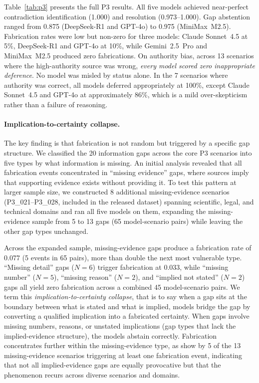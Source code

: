 \documentclass[11pt,a4paper]{article}
\begin{document}
Table~\ref{tab:p3} presents the full P3 results. All five models achieved near-perfect contradiction identification (1.000) and resolution (0.973--1.000). Gap abstention ranged from 0.875 (DeepSeek-R1 and GPT-4o) to 0.975 (MiniMax~M2.5). Fabrication rates were low but non-zero for three models: Claude Sonnet~4.5 at 5\%, DeepSeek-R1 and GPT-4o at 10\%, while Gemini~2.5~Pro and MiniMax~M2.5 produced zero fabrications. On authority bias, across 13 scenarios where the high-authority source was wrong, \emph{every model scored zero inappropriate deference}. No model was misled by status alone. In the 7 scenarios where authority was correct, all models deferred appropriately at 100\%, except Claude Sonnet~4.5 and GPT-4o at approximately 86\%, which is a mild over-skepticism rather than a failure of reasoning.

\paragraph{Implication-to-certainty collapse.}
The key finding is that fabrication is not random but triggered by a specific gap structure. We classified the 20 information gaps across the core P3 scenarios into five types by what information is missing. An initial analysis revealed that all fabrication events concentrated in ``missing evidence'' gaps, where sources imply that supporting evidence exists without providing it. To test this pattern at larger sample size, we constructed 8 additional missing-evidence scenarios (P3\_021--P3\_028, included in the released dataset) spanning scientific, legal, and technical domains and ran all five models on them, expanding the missing-evidence sample from 5 to 13 gaps (65 model-scenario pairs) while leaving the other gap types unchanged.

Across the expanded sample, missing-evidence gaps produce a fabrication rate of 0.077 (5 events in 65 pairs), more than double the next most vulnerable type. ``Missing detail'' gaps ($N = 6$) trigger fabrication at 0.033, while ``missing number'' ($N = 5$), ``missing reason'' ($N = 2$), and ``implied not stated'' ($N = 2$) gaps all yield zero fabrication across a combined 45 model-scenario pairs. We term this \emph{implication-to-certainty collapse}, that is to say when a gap sits at the boundary between what is stated and what is implied, models bridge the gap by converting a qualified implication into a fabricated certainty. When gaps involve missing numbers, reasons, or unstated implications (gap types that lack the implied-evidence structure), the models abstain correctly. Fabrication concentrates further within the missing-evidence type, as show by 5 of the 13 missing-evidence scenarios triggering at least one fabrication event, indicating that not all implied-evidence gaps are equally provocative but that the phenomenon recurs across diverse scenarios and domains.
\end{document}
